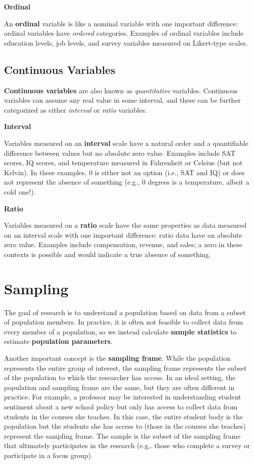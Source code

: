 \documentclass[
]{book}
\begin{document}
\textbf{Ordinal}

An \textbf{ordinal} variable is like a nominal variable with one important difference: ordinal variables have \emph{ordered} categories. Examples of ordinal variables include education levels, job levels, and survey variables measured on Likert-type scales.

\hypertarget{continuous-variables}{%
\subsection{Continuous Variables}\label{continuous-variables}}

\textbf{Continuous variables} are also known as \emph{quantitative} variables. Continuous variables can assume any real value in some interval, and these can be further categorized as either \emph{interval} or \emph{ratio} variables.

\textbf{Interval}

Variables measured on an \textbf{interval} scale have a natural order and a quantifiable difference between values but no absolute zero value. Examples include SAT scores, IQ scores, and temperature measured in Fahrenheit or Celsius (but not Kelvin). In these examples, 0 is either not an option (i.e., SAT and IQ) or does not represent the absence of something (e.g., 0 degrees is a temperature, albeit a cold one!).

\textbf{Ratio}

Variables measured on a \textbf{ratio} scale have the same properties as data measured on an interval scale with one important difference: ratio data have an absolute zero value. Examples include compensation, revenue, and sales; a zero in these contexts is possible and would indicate a true absence of something.

\hypertarget{sampling}{%
\section{Sampling}\label{sampling}}

The goal of research is to understand a population based on data from a subset of population members. In practice, it is often not feasible to collect data from every member of a population, so we instead calculate \textbf{sample statistics} to estimate \textbf{population parameters}.

Another important concept is the \textbf{sampling frame}. While the population represents the entire group of interest, the sampling frame represents the subset of the population to which the researcher has access. In an ideal setting, the population and sampling frame are the same, but they are often different in practice. For example, a professor may be interested in understanding student sentiment about a new school policy but only has access to collect data from students in the courses she teaches. In this case, the entire student body is the population but the students she has access to (those in the courses she teaches) represent the sampling frame. The sample is the subset of the sampling frame that ultimately participates in the research (e.g,. those who complete a survey or participate in a focus group).
\end{document}
